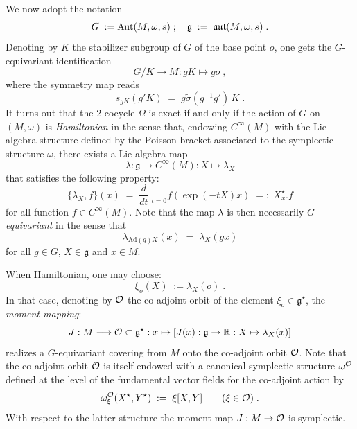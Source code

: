 \documentclass{article}
\newcommand{\R}{\mathbb R}
\renewcommand{\gg}{\mathfrak g}
\def\co{{\cal O}}
\def \R{{\mathbb R}}
\begin{document}
\noindent We now adopt the notation
\begin{equation}
G\;:=\mbox{\rm Aut}(M,\omega,s)\;;\quad\gg\;:=\;\mathfrak{aut}(M,\omega,s)\;.
\end{equation}
Denoting by $K$ the stabilizer subgroup of $G$ of the base point $o$, one gets the $G$-equivariant identification
\begin{equation}
G/K\longrightarrow M: gK\mapsto go\;,
\end{equation}
where the symmetry map reads
\begin{equation}
s_{gK}(g'K)\;=\;g\tilde{\sigma}(g^{-1}g')\,K\;.
\end{equation}
It turns out that the 2-cocycle $\Omega$ is exact if and only if the action of $G$ on $(M,\omega)$
is {\sl Hamiltonian} in the sense that, endowing $C^\infty(M)$ with the Lie algebra structure defined
by the Poisson bracket associated to the symplectic structure $\omega$, 
there exists a Lie algebra map
\begin{equation}
\lambda: \gg\longrightarrow C^\infty(M):X\mapsto\lambda_X
\end{equation}
that satisfies the following property:
\begin{equation}
\{\lambda_X,f\}(x)\;=\;\frac{d}{dt}|_{t=0}f(\exp(-t X)x)\;=:\;X^\star_x.f
\end{equation}
for all function $f\in C^\infty(M)$.
Note that the map $\lambda$ is then necessarily {\sl $G$-equivariant} in the sense that
\begin{equation}
\lambda_{\mbox{Ad}(g)X}(x)\;=\;\lambda_X(gx)
\end{equation}
for all $g\in G$, $X\in\gg$ and $x\in M$.

\noindent When Hamiltonian, one may choose:
\begin{equation}
\xi_o(X)\;:=\lambda_X(o)\;.
\end{equation}
In that case, denoting by $\co$ the co-adjoint orbit of the element $\xi_o\in\gg^\star$,
the {\sl moment mapping}:
\begin{equation}
J: M\longrightarrow\co\subset\gg^\star:x\mapsto[J(x):\gg\to\R:X\mapsto\lambda_X(x)]
\end{equation}
realizes a $G$-equivariant covering from $M$ onto the co-adjoint orbit $\co$. Note that the co-adjoint orbit
$\co$ is itself endowed with a canonical symplectic structure $\omega^\co$ defined at the level
of the fundamental vector fields for the co-adjoint action by
\begin{equation}
\omega^\co_\xi(X^\star,Y^\star)\;:=\;\xi[X,Y]\qquad(\xi\in\co)\;.
\end{equation}
With respect to the latter structure the moment map $J:M\to\co$ is symplectic. 
\end{document}
